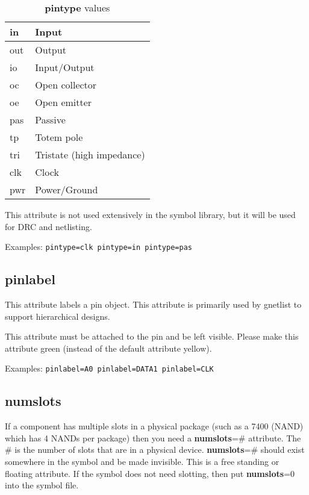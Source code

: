 \documentclass{article}
\begin{document}
\vspace{.125in}

\begin{table}[h]
\begin{center}
\begin{tabular}{|l|l|} \hline
in & Input \\ \hline
out & Output \\ \hline
io & Input/Output \\ \hline
oc & Open collector \\ \hline
oe & Open emitter \\ \hline
pas & Passive \\ \hline
tp & Totem pole \\ \hline
tri & Tristate (high impedance) \\ \hline
clk & Clock \\ \hline
pwr & Power/Ground \\ \hline
\end{tabular}
\end{center}
\caption{{\bf pintype} values} \label{pintype values}
\end{table}

\vspace{.125in}

This attribute is not used extensively in the symbol library, but it
will be used for DRC and netlisting.

Examples: \texttt{pintype=clk pintype=in pintype=pas}   


\subsection{\bf pinlabel\label{pinlabel}}
This attribute labels a pin object.  This attribute is primarily used 
by gnetlist to support hierarchical designs.

This attribute must be attached to the pin and be left visible.  Please
make this attribute green (instead of the default attribute yellow).

Examples: \texttt{pinlabel=A0 pinlabel=DATA1 pinlabel=CLK}


\subsection{\bf numslots\label{numslots}}
If a component has multiple slots in a physical package (such as a 7400
(NAND) which has 4 NANDs per package) then you need a {\bf numslots}=\#
attribute.  The \# is the number of slots that are in a physical device.
{\bf numslots}=\# should exist somewhere in the symbol and be made
invisible.  This is a free standing or floating attribute.  If the symbol
does not need slotting, then put {\bf numslots}=0 into the symbol file.
\end{document}
